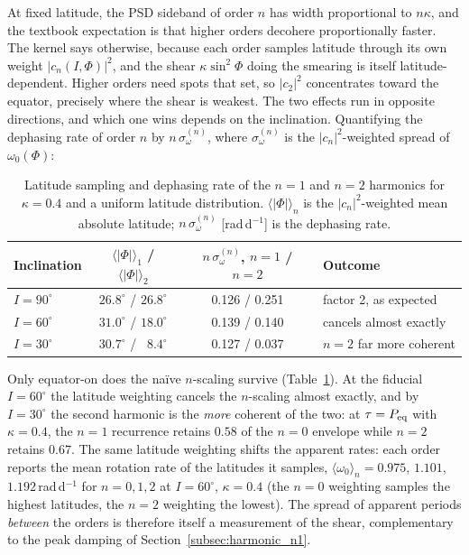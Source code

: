 \documentclass[preprint]{aastex702}
\begin{document}
At fixed latitude, the PSD sideband of order $n$ has width proportional to $n\kappa$, and the textbook expectation is that higher orders decohere proportionally faster. The kernel says otherwise, because each order samples latitude through its own weight $|c_n(I,\Phi)|^2$, and the shear $\kappa\sin^2\Phi$ doing the smearing is itself latitude-dependent. Higher orders need spots that set, so $|c_2|^2$ concentrates toward the equator, precisely where the shear is weakest. The two effects run in opposite directions, and which one wins depends on the inclination. Quantifying the dephasing rate of order $n$ by $n\,\sigma_\omega^{(n)}$, where $\sigma_\omega^{(n)}$ is the $|c_n|^2$-weighted spread of $\omega_0(\Phi)$:

\begin{table}[ht!]
    \centering
    \caption{Latitude sampling and dephasing rate of the $n = 1$ and $n = 2$ harmonics for $\kappa = 0.4$ and a uniform latitude distribution. $\langle|\Phi|\rangle_n$ is the $|c_n|^2$-weighted mean absolute latitude; $n\,\sigma_\omega^{(n)}$ [rad\,d$^{-1}$] is the dephasing rate.}
    \label{tab:harmonic_dephasing}
    \begin{tabular}{lccl}
        \hline
        Inclination & $\langle|\Phi|\rangle_1$ / $\langle|\Phi|\rangle_2$ & $n\,\sigma_\omega^{(n)}$, $n=1$ / $n=2$ & Outcome \\
        \hline
        $I = 90^\circ$ & $26.8^\circ$ / $26.8^\circ$ & 0.126 / 0.251 & factor 2, as expected \\
        $I = 60^\circ$ & $31.0^\circ$ / $18.0^\circ$ & 0.139 / 0.140 & cancels almost exactly \\
        $I = 30^\circ$ & $30.7^\circ$ / $\phantom{0}8.4^\circ$ & 0.127 / 0.037 & $n=2$ far more coherent \\
        \hline
    \end{tabular}
\end{table}

Only equator-on does the na\"ive $n$-scaling survive (Table~\ref{tab:harmonic_dephasing}). At the fiducial $I = 60^\circ$ the latitude weighting cancels the $n$-scaling almost exactly, and by $I = 30^\circ$ the second harmonic is the \emph{more} coherent of the two: at $\tau = P_{\rm eq}$ with $\kappa = 0.4$, the $n = 1$ recurrence retains $0.58$ of the $n = 0$ envelope while $n = 2$ retains $0.67$. The same latitude weighting shifts the apparent rates: each order reports the mean rotation rate of the latitudes it samples, $\langle\omega_0\rangle_n = 0.975$, $1.101$, $1.192$\,rad\,d$^{-1}$ for $n = 0, 1, 2$ at $I = 60^\circ$, $\kappa = 0.4$ (the $n = 0$ weighting samples the highest latitudes, the $n = 2$ weighting the lowest). The spread of apparent periods \emph{between} the orders is therefore itself a measurement of the shear, complementary to the peak damping of Section~\ref{subsec:harmonic_n1}.
\end{document}
